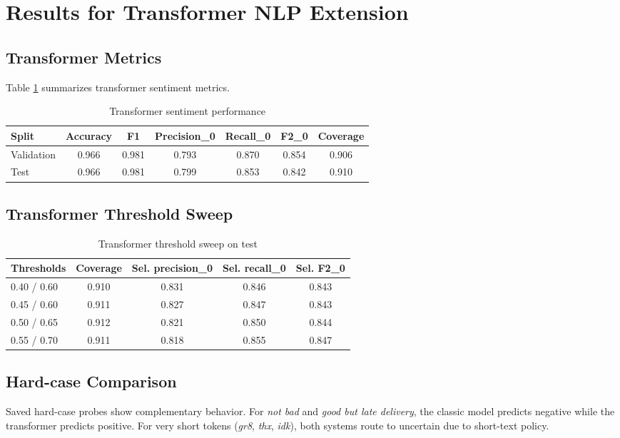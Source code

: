 \documentclass[12pt,a4paper]{article}
\begin{document}
\section{Results for Transformer NLP Extension}
\subsection{Transformer Metrics}
Table \ref{tab:tf_metrics} summarizes transformer sentiment metrics.

\begin{table}[H]
\centering
\caption{Transformer sentiment performance}
\label{tab:tf_metrics}
\begin{tabular}{lcccccc}
\toprule
Split & Accuracy & F1 & Precision\_0 & Recall\_0 & F2\_0 & Coverage \\
\midrule
Validation & 0.966 & 0.981 & 0.793 & 0.870 & 0.854 & 0.906 \\
Test & 0.966 & 0.981 & 0.799 & 0.853 & 0.842 & 0.910 \\
\bottomrule
\end{tabular}
\end{table}

\subsection{Transformer Threshold Sweep}
\begin{table}[H]
\centering
\caption{Transformer threshold sweep on test}
\label{tab:tf_threshold}
\begin{tabular}{lcccc}
\toprule
Thresholds & Coverage & Sel. precision\_0 & Sel. recall\_0 & Sel. F2\_0 \\
\midrule
0.40 / 0.60 & 0.910 & 0.831 & 0.846 & 0.843 \\
0.45 / 0.60 & 0.911 & 0.827 & 0.847 & 0.843 \\
0.50 / 0.65 & 0.912 & 0.821 & 0.850 & 0.844 \\
0.55 / 0.70 & 0.911 & 0.818 & 0.855 & 0.847 \\
\bottomrule
\end{tabular}
\end{table}

\subsection{Hard-case Comparison}
Saved hard-case probes show complementary behavior. For \textit{not bad} and \textit{good but late delivery}, the classic model predicts negative while the transformer predicts positive. For very short tokens (\textit{gr8}, \textit{thx}, \textit{idk}), both systems route to uncertain due to short-text policy.
\end{document}
